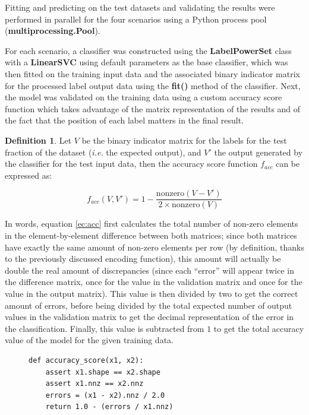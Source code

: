 \documentclass{kthreport}
\theoremstyle{definition}
\newtheorem{definition}{Definition}
\begin{document}
Fitting and predicting on the test datasets and validating the results were performed in parallel for the four scenarios using a Python process pool (\textbf{multiprocessing.Pool}). 

For each scenario, a classifier was constructed using the \textbf{LabelPowerSet} class with a \textbf{LinearSVC} using default parameters as the base classifier, which was then fitted on the training input data and the associated binary indicator matrix for the processed label output data using the \textbf{fit()} method of the classifier.
Next, the model was validated on the training data using a custom accuracy score function which takes advantage of the matrix representation of the results and of the fact that the position of each label matters in the final result. 

\begin{definition}
    Let $V$ be the binary indicator matrix for the labels for the test fraction of the dataset (\emph{i.e.} the expected output), and $V'$ the output generated by the classifier for the test input data, then the accuracy score function $f_{acc}$ can be expressed as:
    
    \begin{equation}\label{ec:acc}
    f_{acc}(V, V') = 1 - \frac{\text{nonzero}(V - V')}{2 \times \text{nonzero}(V)}
    \end{equation}
\end{definition}

In words, equation \ref{ec:acc} first calculates the total number of non-zero elements in the element-by-element difference between both matrices; since both matrices have exactly the same amount of non-zero elements per row (by definition, thanks to the previously discussed encoding function), this amount will actually be double the real amount of discrepancies (since each ``error'' will appear twice in the difference matrix, once for the value in the validation matrix and once for the value in the output matrix).
This value is then divided by two to get the correct amount of errors, before being divided by the total expected number of output values in the validation matrix to get the decimal representation of the error in the classification.
Finally, this value is subtracted from $1$ to get the total accuracy value of the model for the given training data. 

\begin{figure}[tb]
\begin{lstlisting}[style=MyPython, caption={Accuracy score function implemented in Python}]
def accuracy_score(x1, x2):
    assert x1.shape == x2.shape
    assert x1.nnz == x2.nnz
    errors = (x1 - x2).nnz / 2.0
    return 1.0 - (errors / x1.nnz)
\end{lstlisting}
\end{figure}
\end{document}
